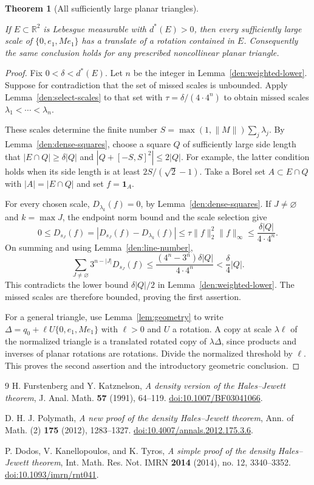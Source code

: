 \documentclass[11pt]{amsart}
\newcommand{\R}{\mathbb R}
\newcommand{\one}{\mathbf 1}
\newtheorem{theorem}{Theorem}[section]
\theoremstyle{definition}
\theoremstyle{remark}
\numberwithin{equation}{section}
\providecommand{\lean}[1]{}
\providecommand{\leanok}{}
\begin{document}
\begin{theorem}[All sufficiently large planar triangles]\label{den:main}
\lean{Auto.den_main,Auto.den_main_general}
\leanok
If $E\subset\R^2$ is Lebesgue measurable with $d^*(E)>0$,
then every sufficiently large scale of
$\{0,e_1,Me_1\}$ has a translate of a rotation contained
in $E$.  Consequently the same conclusion holds for any
prescribed noncollinear planar triangle.
\end{theorem}
\begin{proof}
Fix $0<\delta<d^*(E)$.  Let $n$ be the integer in
Lemma~\ref{den:weighted-lower}.  Suppose for contradiction
that the set of missed scales is unbounded.  Apply
Lemma~\ref{den:select-scales} to that set with
$\tau=\delta/(4\cdot4^n)$ to obtain missed scales
$\lambda_1<\cdots<\lambda_n$.

These scales determine the finite number
$S=\max(1,\|M\|)\sum_j\lambda_j$.  By
Lemma~\ref{den:dense-squares}, choose a square $Q$ of
sufficiently large side length that
$|E\cap Q|\ge\delta|Q|$ and $|Q+[-S,S]^2|\le2|Q|$.
For example, the latter condition holds when its side
length is at least $2S/(\sqrt2-1)$.  Take a Borel set
$A\subset E\cap Q$ with $|A|=|E\cap Q|$ and set
$f=\one_A$.

For every chosen scale, $D_{\lambda_k}(f)=0$, by
Lemma~\ref{den:dense-squares}.  If $J\ne\varnothing$ and
$k=\max J$, the endpoint norm bound and the scale selection
give
\[
 0\le D_{s_J}(f)
   =|D_{s_J}(f)-D_{\lambda_k}(f)|
   \le \tau\|f\|_2^2\|f\|_\infty
   \le\frac{\delta|Q|}{4\cdot4^n}.
\]
On summing and using Lemma~\ref{den:line-number},
\[
 \sum_{J\ne\varnothing}3^{n-|J|}D_{s_J}(f)
    \le\frac{(4^n-3^n)\delta|Q|}{4\cdot4^n}
    <\frac{\delta}{4}|Q|.
\]
This contradicts the lower bound $\delta|Q|/2$ in
Lemma~\ref{den:weighted-lower}.  The missed scales are
therefore bounded, proving the first assertion.

For a general triangle, use Lemma~\ref{lem:geometry} to write
$\Delta=q_0+\ell U\{0,e_1,Me_1\}$ with $\ell>0$ and
$U$ a rotation.  A copy at scale $\lambda\ell$ of the
normalized triangle is a translated rotated copy of
$\lambda\Delta$, since products and inverses of planar
rotations are rotations.  Divide the normalized threshold
by $\ell$.  This proves the second assertion and the
introductory geometric conclusion.
\end{proof}

\begin{thebibliography}{9}
H. Furstenberg and Y. Katznelson,
\emph{A density version of the Hales--Jewett theorem},
J. Anal. Math. \textbf{57} (1991), 64--119.
\href{https://doi.org/10.1007/BF03041066}{doi:10.1007/BF03041066}.

D. H. J. Polymath,
\emph{A new proof of the density Hales--Jewett theorem},
Ann. of Math. (2) \textbf{175} (2012), 1283--1327.
\href{https://doi.org/10.4007/annals.2012.175.3.6}{doi:10.4007/annals.2012.175.3.6}.

P. Dodos, V. Kanellopoulos, and K. Tyros,
\emph{A simple proof of the density Hales--Jewett theorem},
Int. Math. Res. Not. IMRN \textbf{2014} (2014), no. 12, 3340--3352.
\href{https://doi.org/10.1093/imrn/rnt041}{doi:10.1093/imrn/rnt041}.
\end{thebibliography}
\end{document}
